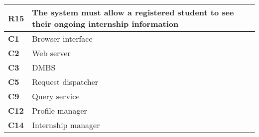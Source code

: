 \begin{table}[H]
    \centering
    \begin{tabular}{|l|m{10cm}|}
        \hline \textbf{R15} & The system must allow a registered student to see their ongoing internship information \\
        \hline \textbf{C1} & Browser interface \\
        \hline \textbf{C2} & Web server \\
        \hline \textbf{C3} & DMBS \\
        \hline \textbf{C5} & Request dispatcher \\
        \hline \textbf{C9} & Query service \\
        \hline \textbf{C12} & Profile manager \\
        \hline \textbf{C14} & Internship manager \\
        \hline
    \end{tabular}
\end{table}


